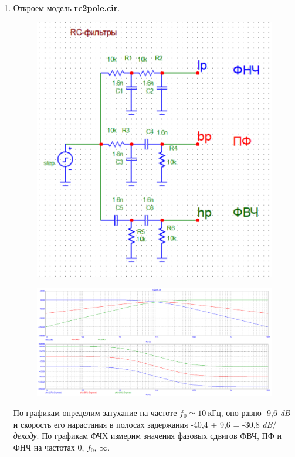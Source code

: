 \documentclass[a4paper, 12pt]{article}%
\begin{document}
\begin{enumerate}

\item Откроем модель \textbf{rc2pole.cir}. 

\begin{figure}[h!]
\centering
\includegraphics[scale=0.4]{rc2pole_img.png}
\label{fig:Image1}
\end{figure}

\begin{figure}[h!]
\centering
\includegraphics[scale=0.4]{rc2pole_AC.png}
\label{fig:Image1}
\end{figure}

По графикам определим затухание на частоте $f_0 \simeq 10 \: \textit{кГц}$, оно равно -9,6 \textit{dB} и скорость его нарастания в полосах задержания -40,4 + 9,6 = -30,8 \textit{dB}/\textit{декаду}. По графикам  ФЧХ измерим значения фазовых сдвигов  ФВЧ, ПФ и ФНЧ на частотах 0, $f_0$, $\infty$.


\end{enumerate}
\end{document}
